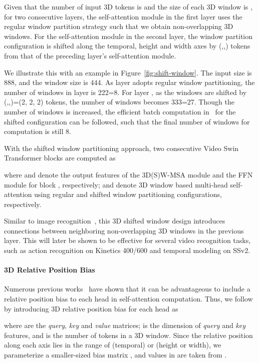 \documentclass{article}
\begin{document}
Given that the number of input 3D tokens is  and the size of each 3D window is , for two consecutive layers, the self-attention module in the first layer uses the regular window partition strategy such that we obtain  non-overlapping 3D windows. For the self-attention module in the second layer, the window partition configuration is shifted along the temporal, height and width axes by (,,) tokens from that of the preceding layer's self-attention module.

We illustrate this with an example in Figure~\ref{fig:shift-window}. The input size is 888, and the window size is 444. As layer  adopts regular window partitioning, the number of windows in layer  is 222=8. For layer , as the windows are shifted by (,,)=(2, 2, 2) tokens, the number of windows becomes 333=27. Though the number of windows is increased, the efficient batch computation in~\cite{liu2021swin} for the shifted configuration can be followed, such that the final number of windows for computation is still 8.



With the shifted window partitioning approach, two consecutive Video Swin Transformer blocks are computed as

where  and  denote the output features of the 3D(S)W-MSA module and the FFN module for block , respectively;  and  denote 3D window based multi-head self-attention using regular and shifted window partitioning configurations, respectively.

Similar to image recognition~\cite{liu2021swin}, this 3D shifted window design introduces connections between neighboring non-overlapping 3D windows in the previous layer. This will later be shown to be effective for several video recognition tasks, such as action recognition on Kinetics 400/600 and temporal modeling on SSv2.

\paragraph{3D Relative Position Bias} Numerous previous works~\cite{raffel2019t5,bao2020unilmv2,hu2018relation,hu2019localrelation} have shown that it can be advantageous to include a relative position bias to each head in self-attention computation. Thus, we follow~\cite{liu2021swin} by introducing 3D relative position bias  for each head as

where  are the \emph{query}, \emph{key} and \emph{value} matrices;  is the dimension of \emph{query} and \emph{key} features, and  is the number of tokens in a 3D window. Since the relative position along each axis lies in the range of   (temporal) or  (height or width), we parameterize a smaller-sized bias matrix , and values in  are taken from .
\end{document}
